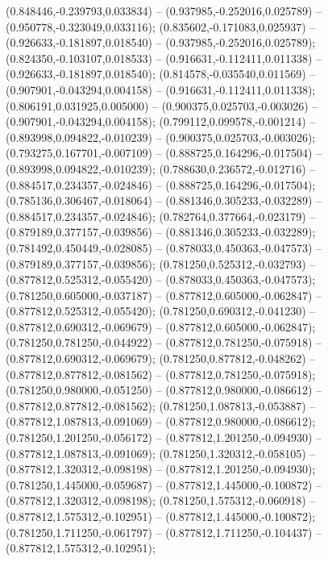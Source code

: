  (0.848446,-0.239793,0.033834) -- (0.937985,-0.252016,0.025789) -- (0.950778,-0.323049,0.033116);
 (0.835602,-0.171083,0.025937) -- (0.926633,-0.181897,0.018540) -- (0.937985,-0.252016,0.025789);
 (0.824350,-0.103107,0.018533) -- (0.916631,-0.112411,0.011338) -- (0.926633,-0.181897,0.018540);
 (0.814578,-0.035540,0.011569) -- (0.907901,-0.043294,0.004158) -- (0.916631,-0.112411,0.011338);
 (0.806191,0.031925,0.005000) -- (0.900375,0.025703,-0.003026) -- (0.907901,-0.043294,0.004158);
 (0.799112,0.099578,-0.001214) -- (0.893998,0.094822,-0.010239) -- (0.900375,0.025703,-0.003026);
 (0.793275,0.167701,-0.007109) -- (0.888725,0.164296,-0.017504) -- (0.893998,0.094822,-0.010239);
 (0.788630,0.236572,-0.012716) -- (0.884517,0.234357,-0.024846) -- (0.888725,0.164296,-0.017504);
 (0.785136,0.306467,-0.018064) -- (0.881346,0.305233,-0.032289) -- (0.884517,0.234357,-0.024846);
 (0.782764,0.377664,-0.023179) -- (0.879189,0.377157,-0.039856) -- (0.881346,0.305233,-0.032289);
 (0.781492,0.450449,-0.028085) -- (0.878033,0.450363,-0.047573) -- (0.879189,0.377157,-0.039856);
 (0.781250,0.525312,-0.032793) -- (0.877812,0.525312,-0.055420) -- (0.878033,0.450363,-0.047573);
 (0.781250,0.605000,-0.037187) -- (0.877812,0.605000,-0.062847) -- (0.877812,0.525312,-0.055420);
 (0.781250,0.690312,-0.041230) -- (0.877812,0.690312,-0.069679) -- (0.877812,0.605000,-0.062847);
 (0.781250,0.781250,-0.044922) -- (0.877812,0.781250,-0.075918) -- (0.877812,0.690312,-0.069679);
 (0.781250,0.877812,-0.048262) -- (0.877812,0.877812,-0.081562) -- (0.877812,0.781250,-0.075918);
 (0.781250,0.980000,-0.051250) -- (0.877812,0.980000,-0.086612) -- (0.877812,0.877812,-0.081562);
 (0.781250,1.087813,-0.053887) -- (0.877812,1.087813,-0.091069) -- (0.877812,0.980000,-0.086612);
 (0.781250,1.201250,-0.056172) -- (0.877812,1.201250,-0.094930) -- (0.877812,1.087813,-0.091069);
 (0.781250,1.320312,-0.058105) -- (0.877812,1.320312,-0.098198) -- (0.877812,1.201250,-0.094930);
 (0.781250,1.445000,-0.059687) -- (0.877812,1.445000,-0.100872) -- (0.877812,1.320312,-0.098198);
 (0.781250,1.575312,-0.060918) -- (0.877812,1.575312,-0.102951) -- (0.877812,1.445000,-0.100872);
 (0.781250,1.711250,-0.061797) -- (0.877812,1.711250,-0.104437) -- (0.877812,1.575312,-0.102951);
